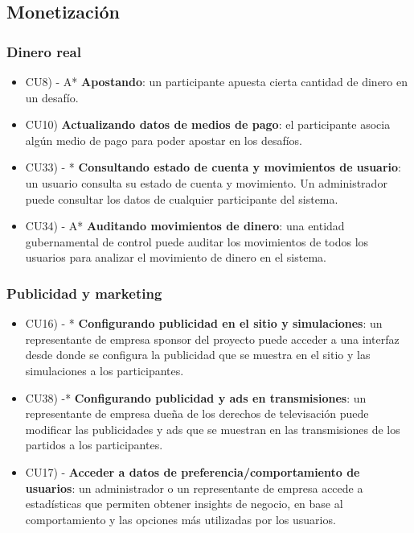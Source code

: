 \subsection{Monetización}
\subsubsection{Dinero real}
\begin{itemize}
\item CU8) - A* \textbf{Apostando}: un participante apuesta cierta cantidad de dinero en un desafío.

\item CU10) \textbf{Actualizando datos de medios de pago}: el participante asocia algún medio de pago para poder apostar en los desafíos.

\item CU33) - * \textbf{Consultando estado de cuenta y movimientos de usuario}: un usuario consulta su estado de cuenta y movimiento. Un administrador puede consultar los datos de cualquier participante del sistema.

\item CU34) - A* \textbf{Auditando movimientos de dinero}: una entidad gubernamental de control puede auditar los movimientos de todos los usuarios para analizar el movimiento de dinero en el sistema.


\end{itemize}

\subsubsection{Publicidad y marketing}
\begin{itemize}

\item CU16) - * \textbf{Configurando publicidad en el sitio y simulaciones}: un representante de empresa sponsor del proyecto puede acceder a una interfaz desde donde se configura la publicidad que se muestra en el sitio y las simulaciones a los participantes.

\item CU38) -* \textbf{Configurando publicidad y ads en transmisiones}: un representante de empresa dueña de los derechos de televisación puede modificar las publicidades y ads que se muestran en las transmisiones de los partidos a los participantes.

\item CU17) - \textbf{Acceder a datos de preferencia/comportamiento de usuarios}: un administrador o un representante de empresa accede a estadísticas que permiten obtener insights de negocio, en base al comportamiento y las opciones más utilizadas por los usuarios.
  

\end{itemize}

